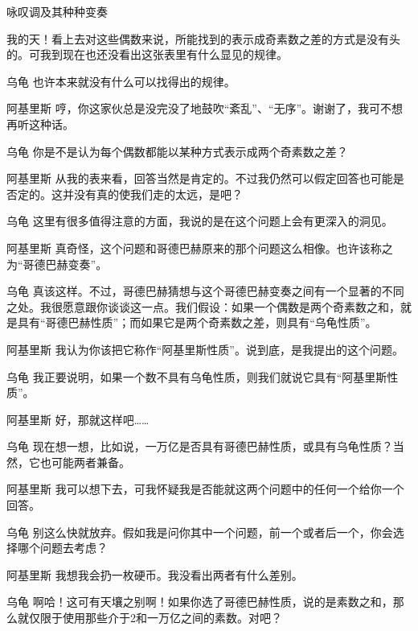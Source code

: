 \begin{dialog}{咏叹调及其种种变奏}
\begin{dialogue}
我的天！看上去对这些偶数来说，所能找到的表示成奇素数之差的方式是没有头的。可我到现在也还没看出这张表里有什么显见的规律。

\item[乌龟]也许本来就没有什么可以找得出的规律。

\item[阿基里斯]哼，你这家伙总是没完没了地鼓吹“紊乱”、“无序”。谢谢了，我可不想再听这种话。

\item[乌龟]你是不是认为每个偶数都能以某种方式表示成两个奇素数之差？

\item[阿基里斯]从我的表来看，回答当然是肯定的。不过我仍然可以假定回答也可能是否定的。这并没有真的使我们走的太远，是吧？

\item[乌龟]这里有很多值得注意的方面，我说的是在这个问题上会有更深入的洞见。

\item[阿基里斯]真奇怪，这个问题和哥德巴赫原来的那个问题这么相像。也许该称之为“哥德巴赫变奏”。

\item[乌龟]真该这样。不过，哥德巴赫猜想与这个哥德巴赫变奏之间有一个显著的不同之处。我很愿意跟你谈谈这一点。我们假设：如果一个偶数是两个奇素数之和，就是具有“哥德巴赫性质”；而如果它是两个奇素数之差，则具有“乌龟性质”。

\item[阿基里斯]我认为你该把它称作“阿基里斯性质”。说到底，是我提出的这个问题。

\item[乌龟]我正要说明，如果一个数不具有乌龟性质，则我们就说它具有“阿基里斯性质”。

\item[阿基里斯]好，那就这样吧……

\item[乌龟]现在想一想，比如说，一万亿是否具有哥德巴赫性质，或具有乌龟性质？当然，它也可能两者兼备。

\item[阿基里斯]我可以想下去，可我怀疑我是否能就这两个问题中的任何一个给你一个回答。

\item[乌龟]别这么快就放弃。假如我是问你其中一个问题，前一个或者后一个，你会选择哪个问题去考虑？

\item[阿基里斯]我想我会扔一枚硬币。我没看出两者有什么差别。

\item[乌龟]啊哈！这可有天壤之别啊！如果你选了哥德巴赫性质，说的是素数之和，那么就仅限于使用那些介于2和一万亿之间的素数。对吧？


\end{dialogue}
\end{dialog}
